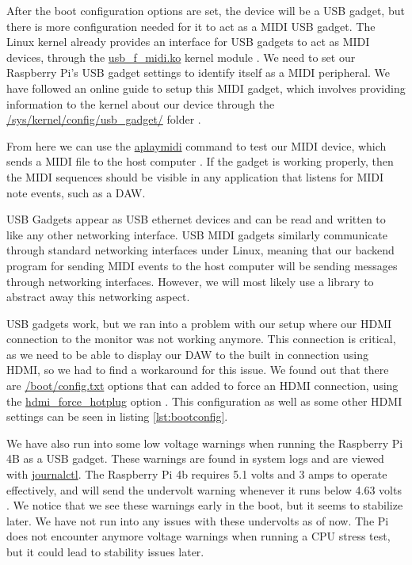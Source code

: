 After the boot configuration options are set, the device will be a USB gadget, but there
is more configuration needed for it to act as a MIDI USB gadget. The Linux kernel already
provides an interface for USB gadgets to act as MIDI devices, through the
\url{usb_f_midi.ko} kernel module \autocite{usbGadgetDocumentation}. We need to set our
Raspberry Pi's USB gadget settings to identify itself as a MIDI peripheral. We have
followed an online guide to setup this MIDI gadget, which involves providing information
to the kernel about our device through the \url{/sys/kernel/config/usb_gadget/} folder
\autocite{raspberryPiGadgetSetup}.

From here we can use the \url{aplaymidi} command to test our MIDI device, which sends a
MIDI file to the host computer \autocite{gadgetTesting}. If the gadget is working
properly, then the MIDI sequences should be visible in any application that listens for
MIDI note events, such as a DAW.

USB Gadgets appear as USB ethernet devices and can be read and written to like any other
networking interface. USB MIDI gadgets similarly communicate through standard networking
interfaces under Linux, meaning that our backend program for sending MIDI events to the
host computer will be sending messages through networking interfaces. However, we will
most likely use a library to abstract away this networking aspect.

USB gadgets work, but we ran into a problem with our setup where our HDMI connection to
the monitor was not working anymore. This connection is critical, as we need to be able to
display our DAW to the built in connection using HDMI, so we had to find a workaround for
this issue. We found out that there are \url{/boot/config.txt} options that can added to
force an HDMI connection, using the \url{hdmi_force_hotplug} option
\autocite{raspberryPiHDMIFix}. This configuration as well as some other HDMI settings can
be seen in listing \ref{lst:bootconfig}.

We have also run into some low voltage warnings when running the Raspberry Pi 4B as a USB
gadget. These warnings are found in system logs and are viewed with \url{journalctl}. The
Raspberry Pi 4b requires 5.1 volts and 3 amps to operate effectively, and will send the
undervolt warning whenever it runs below 4.63 volts \autocite{raspberryPiAmps}. We notice
that we see these warnings early in the boot, but it seems to stabilize later. We have not
run into any issues with these undervolts as of now. The Pi does not encounter anymore
voltage warnings when running a CPU stress test, but it could lead to stability issues
later.

